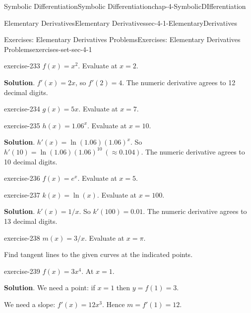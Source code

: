 \documentclass[oneside,10pt,]{book}
\numberwithin{equation}{section}
\begin{document}
\begin{chapterptx}{Symbolic Differentiation}{}{Symbolic Differentiation}{}{}{chap-4-SymbolicDIfferentiation}
\begin{sectionptx}{Elementary Derivatives}{}{Elementary Derivatives}{}{}{sec-4-1-ElementaryDerivatives}
\begin{exercises-subsection-numberless}{Exercises: Elementary Derivatives Problems}{}{Exercises: Elementary Derivatives Problems}{}{}{exercises-set-sec-4-1}
\begin{divisionexercise}{13}{}{}{exercise-233}%
\hypertarget{p-1494}{}%
\(f(x)=x^2\).  Evaluate at \(x=2\).%
\par\smallskip%
\noindent\textbf{Solution}.\hypertarget{solution-116}{}\quad%
\hypertarget{p-1495}{}%
\(f'(x)=2x\), so \(f'(2)=4\).  The numeric derivative agrees to 12 decimal digits.%
\end{divisionexercise}%
\begin{divisionexercise}{14}{}{}{exercise-234}%
\hypertarget{p-1496}{}%
\(g(x)=5x\).  Evaluate at \(x=7\).%
\end{divisionexercise}%
\begin{divisionexercise}{15}{}{}{exercise-235}%
\hypertarget{p-1497}{}%
\(h(x)=1.06^x\).  Evaluate at \(x=10\).%
\par\smallskip%
\noindent\textbf{Solution}.\hypertarget{solution-117}{}\quad%
\hypertarget{p-1498}{}%
\(h'(x)=\ln(1.06)(1.06)^x\).  So \(h'(10)=\ln(1.06)(1.06)^{10}\   (\approx 0.104)\). The numeric derivative agrees to 10 decimal digits.%
\end{divisionexercise}%
\begin{divisionexercise}{16}{}{}{exercise-236}%
\hypertarget{p-1499}{}%
\(f(x)=e^x\).  Evaluate at \(x=5\).%
\end{divisionexercise}%
\begin{divisionexercise}{17}{}{}{exercise-237}%
\hypertarget{p-1500}{}%
\(k(x)=\ln(x)\).  Evaluate at \(x=100\).%
\par\smallskip%
\noindent\textbf{Solution}.\hypertarget{solution-118}{}\quad%
\hypertarget{p-1501}{}%
\(k'(x)=1/x\).   So \(k'(100)=0.01\). The numeric derivative agrees to 13 decimal digits.%
\end{divisionexercise}%
\begin{divisionexercise}{18}{}{}{exercise-238}%
\hypertarget{p-1502}{}%
\(m(x)=3/x\).  Evaluate at \(x=\pi\).%
\end{divisionexercise}%
\hypertarget{p-1503}{}%
Find tangent lines to the given curves at the indicated points.%
\begin{divisionexercise}{19}{}{}{exercise-239}%
\hypertarget{p-1504}{}%
\(f(x)=3x^4\).  At \(x=1\).%
\par\smallskip%
\noindent\textbf{Solution}.\hypertarget{solution-119}{}\quad%
\hypertarget{p-1505}{}%
We need a point: if \(x =1\) then \(y=f(1)=3\).%
\par
\hypertarget{p-1506}{}%
We need a slope: \(f'(x)=12 x^3\).   Hence \(m=f'(1)=12\).%
\par

\end{divisionexercise}
\end{exercises-subsection-numberless}
\end{sectionptx}
\end{chapterptx}
\end{document}
